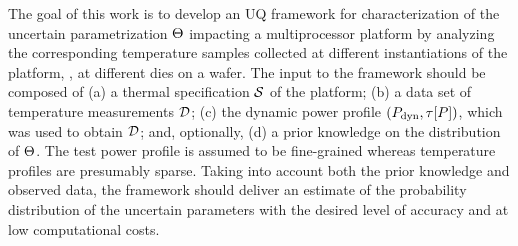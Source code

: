 The goal of this work is to develop an UQ framework for characterization of the uncertain parametrization $\Theta$ impacting a multiprocessor platform by analyzing the corresponding temperature samples collected at different instantiations of the platform, \eg, at different dies on a wafer. The input to the framework should be composed of (a) a thermal specification $\mathcal{S}$ of the platform; (b) a data set of temperature measurements $\mathcal{D}$; (c) the dynamic power profile $(P_{\text{dyn}}, \tau[P])$, which was used to obtain $\mathcal{D}$; and, optionally, (d) a prior knowledge on the distribution of $\Theta$. The test power profile is assumed to be fine-grained whereas temperature profiles are presumably sparse. Taking into account both the prior knowledge and observed data, the framework should deliver an estimate of the probability distribution of the uncertain parameters with the desired level of accuracy and at low computational costs.

